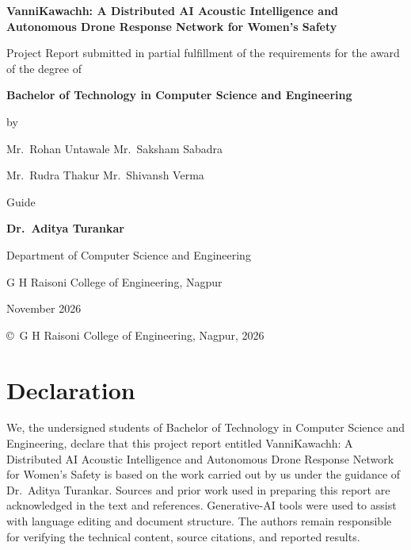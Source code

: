 \documentclass[12pt,a4paper]{report}
\begin{document}
\begin{titlepage}
\centering
{\Large\bfseries VanniKawachh: A Distributed AI Acoustic Intelligence
and Autonomous Drone Response Network for Women's Safety\par}
\vspace{1.1cm}
{\large Project Report submitted in partial fulfillment of the
requirements for the award of the degree of\par}
\vspace{.3cm}
{\large\bfseries Bachelor of Technology in Computer Science and Engineering\par}
\vspace{.75cm}
{\large by\par}\vspace{.3cm}
{\large Mr.~Rohan Untawale \qquad Mr.~Saksham Sabadra\par}
{\large Mr.~Rudra Thakur \qquad Mr.~Shivansh Verma\par}
\vspace{1cm}
{\large Guide\par}
{\large\bfseries Dr.~Aditya Turankar\par}
\vspace{1cm}
{\large Department of Computer Science and Engineering\par}
{\large G H Raisoni College of Engineering, Nagpur\par}
\vspace{.5cm}
{\large November 2026\par}
\vfill
{\small \copyright\ G H Raisoni College of Engineering, Nagpur, 2026\par}
\end{titlepage}


\chapter*{Declaration}

We, the undersigned students of Bachelor of Technology in Computer
Science and Engineering, declare that this project report entitled
VanniKawachh: A Distributed AI Acoustic Intelligence and
Autonomous Drone Response Network for Women's Safety is based on the
work carried out by us under the guidance of Dr.~Aditya Turankar.
Sources and prior work used in preparing this report are acknowledged
in the text and references. Generative-AI tools were used to assist
with language editing and document structure. The authors remain
responsible for verifying the technical content, source citations,
and reported results.
\end{document}
